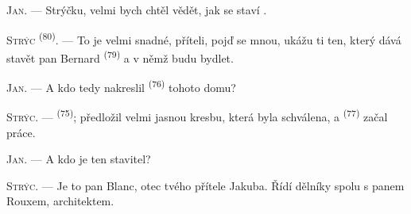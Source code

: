 %
%
%

\VUsaut{6.0mm}
\VUsaut{1.4mm}
\VUsaut{2.2mm}

\VUsaut{3.0mm}

\textsc{Jan}. --- Strýčku, velmi bych chtěl vědět, jak se staví .

\textsc{Strýc} \textsuperscript{(80)}. --- To je velmi snadné, příteli, pojď se mnou,
ukážu ti ten, který dává stavět pan Bernard \textsuperscript{(79)} a v němž budu
bydlet.

\textsc{Jan}. --- A kdo tedy nakreslil  \textsuperscript{(76)} tohoto
domu?

\textsc{Strýc}. ---  \textsuperscript{(75)}; předložil velmi jasnou
kresbu, která byla schválena, a  \textsuperscript{(77)} začal práce.

\textsc{Jan}. --- A kdo je ten stavitel?

\textsc{Strýc}. --- Je to pan Blanc, otec tvého přítele Jakuba. Řídí dělníky spolu s
panem Rouxem, architektem.

